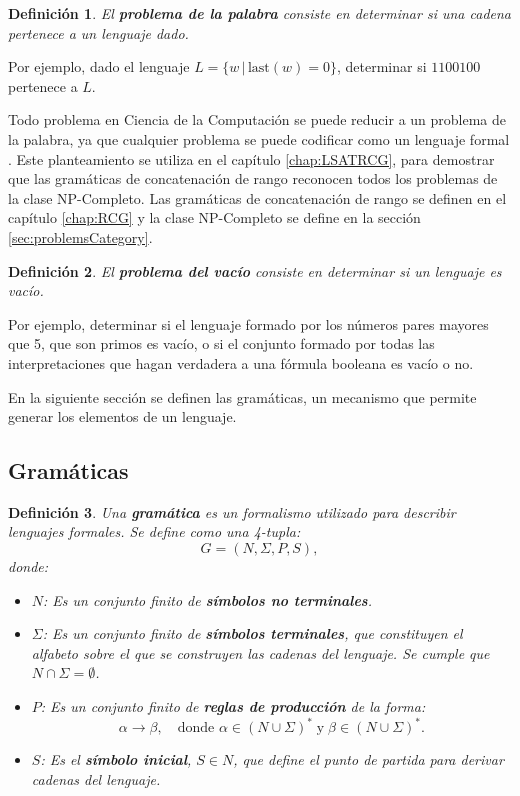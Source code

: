 \documentclass[12pt]{article}
\newtheorem{definition}{Definición}
\begin{document}
\begin{definition}
  El \textbf{problema de la palabra} consiste en determinar si una cadena pertenece a un lenguaje dado. 
\end{definition}
Por ejemplo, dado el lenguaje $L=\{w\,|\,\text{last}(w)=0\}$, determinar si $1100100$ pertenece a $L$.

Todo problema en Ciencia de la Computación se puede reducir a un problema de la palabra, 
ya que cualquier problema se puede codificar como un lenguaje formal \cite{authomataTheory}. Este planteamiento
se utiliza en el capítulo \ref{chap:LSATRCG}, para demostrar que las gramáticas de concatenación de rango
reconocen todos los problemas de la clase NP-Completo. Las gramáticas de concatenación de rango se definen en el 
capítulo \ref{chap:RCG} y la clase NP-Completo se define en la sección \ref{sec:problemsCategory}.

\begin{definition} 
  El \textbf{problema del vacío} consiste en determinar si un lenguaje es vacío.
\end{definition}
Por ejemplo, determinar si el lenguaje formado por los números pares mayores que 5, que son primos es vacío, o si el conjunto formado por todas las interpretaciones que hagan verdadera a una fórmula booleana es vacío o no.

En la siguiente sección se definen las gramáticas, un mecanismo que permite generar los elementos de un lenguaje.

\subsection{Gramáticas}
\label{sec:grammars}

\begin{definition}
  Una \textbf{gramática} es un formalismo utilizado para describir lenguajes formales. Se define como una 4-tupla:
  \[
    G = (N, \Sigma, P, S),
  \]
  donde:
  \begin{itemize}
    \item \(N\): Es un conjunto finito de \textbf{símbolos no terminales}.
    \item \(\Sigma\): Es un conjunto finito de \textbf{símbolos terminales}, que constituyen el alfabeto sobre el que se construyen las cadenas del lenguaje. Se cumple que \(N \cap \Sigma = \emptyset\).
    \item \(P\): Es un conjunto finito de \textbf{reglas de producción} de la forma:
          \[
            \alpha \to \beta, \quad \text{donde } \alpha \in (N \cup \Sigma)^* \;\text{y}\; \beta \in (N \cup \Sigma)^*.
          \]
          
    \item \(S\): Es el \textbf{símbolo inicial}, \(S \in N\), que define el punto de partida para derivar cadenas del lenguaje.
  \end{itemize}
\end{definition}
\end{document}
